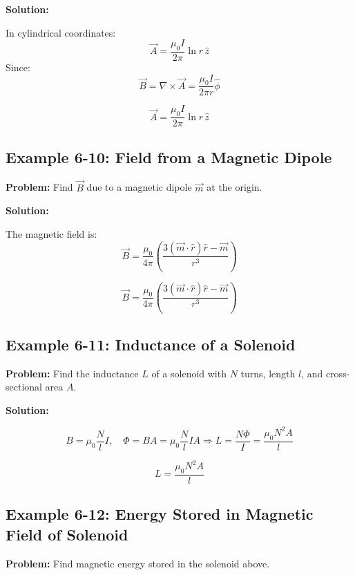 \documentclass[12pt]{article}
\begin{document}
\textbf{Solution:}

In cylindrical coordinates:
\[
\vec{A} = \frac{\mu_0 I}{2\pi} \ln r \, \hat{z}
\]
Since:
\[
\vec{B} = \nabla \times \vec{A} = \frac{\mu_0 I}{2\pi r} \hat{\phi}
\]

\begin{tcolorbox}
\[
\boxed{\vec{A} = \frac{\mu_0 I}{2\pi} \ln r \, \hat{z}}
\]
\end{tcolorbox}

\subsection*{Example 6-10: Field from a Magnetic Dipole}

\textbf{Problem:}  
Find \( \vec{B} \) due to a magnetic dipole \( \vec{m} \) at the origin.

\textbf{Solution:}

The magnetic field is:
\[
\vec{B} = \frac{\mu_0}{4\pi} \left( \frac{3(\vec{m} \cdot \hat{r})\hat{r} - \vec{m}}{r^3} \right)
\]

\begin{tcolorbox}
\[
\boxed{
\vec{B} = \frac{\mu_0}{4\pi} \left( \frac{3(\vec{m} \cdot \hat{r})\hat{r} - \vec{m}}{r^3} \right)
}
\]
\end{tcolorbox}

\subsection*{Example 6-11: Inductance of a Solenoid}

\textbf{Problem:}  
Find the inductance \( L \) of a solenoid with \( N \) turns, length \( l \), and cross-sectional area \( A \).

\textbf{Solution:}

\[
B = \mu_0 \frac{N}{l} I, \quad \Phi = B A = \mu_0 \frac{N}{l} I A
\Rightarrow L = \frac{N \Phi}{I} = \frac{\mu_0 N^2 A}{l}
\]

\begin{tcolorbox}
\[
\boxed{L = \frac{\mu_0 N^2 A}{l}}
\]
\end{tcolorbox}

\subsection*{Example 6-12: Energy Stored in Magnetic Field of Solenoid}

\textbf{Problem:}  
Find magnetic energy stored in the solenoid above.
\end{document}
